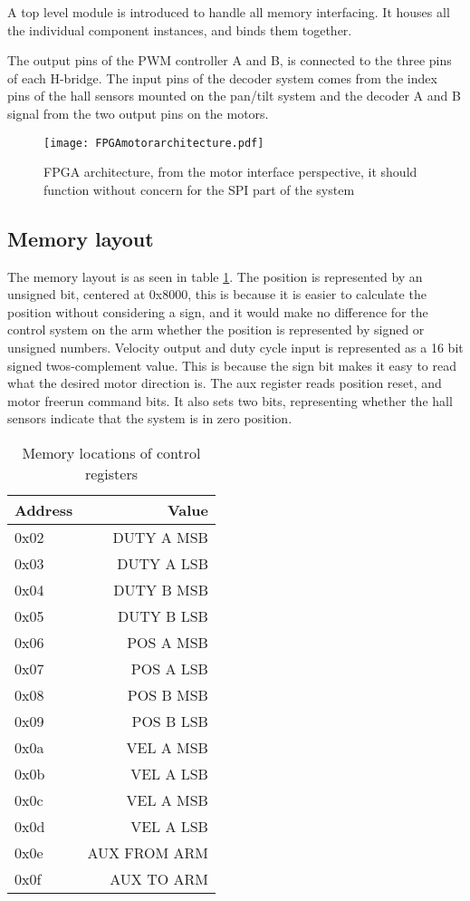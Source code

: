 A top level module is introduced to handle all memory interfacing. It houses all the individual component instances, and binds them together.

The output pins of the PWM controller A and B, is connected to the three pins of each H-bridge.
The input pins of the decoder system comes from the index pins of the hall sensors mounted on the pan/tilt system and the decoder A and B signal from the two output pins on the motors.

\begin{figure}[htb]
\centering
\texttt{[image: FPGAmotorarchitecture.pdf]}

\caption{FPGA architecture, from the motor interface perspective, it should function without concern for the SPI part of the system}
\label{fig:FPGAMotorArchitecture}
\end{figure}

\subsection{Memory layout}
The memory layout is as seen in table \ref{tab:Memorymapping}. The position is represented by an unsigned bit, centered at 0x8000, this is because it is easier to calculate the position without considering a sign, and it would make no difference for the control system on the arm whether the position is represented by signed or unsigned numbers.
Velocity output and duty cycle input is represented as a 16 bit signed twos-complement value.
This is because the sign bit makes it easy to read what the desired motor direction is.
The aux register reads position reset, and motor freerun command bits. It also sets two bits, representing whether the hall sensors indicate that the system is in zero position.



\begin{table}[htb]
\centering
\begin{tabular}{|l|r|}
\hline
Address & Value \\
\hline
0x02 & DUTY A MSB \\
0x03 & DUTY A LSB\\
0x04 & DUTY B MSB\\
0x05 & DUTY B LSB\\
0x06 & POS A MSB\\
0x07 & POS A LSB\\
0x08 & POS B MSB\\
0x09 & POS B LSB\\
0x0a & VEL A MSB\\
0x0b & VEL A LSB\\
0x0c & VEL A MSB\\
0x0d & VEL A LSB\\
0x0e & AUX FROM ARM\\
0x0f & AUX TO ARM\\
\hline 
\end{tabular}
\caption{Memory locations of control registers}
\label{tab:Memorymapping}
\end{table}


